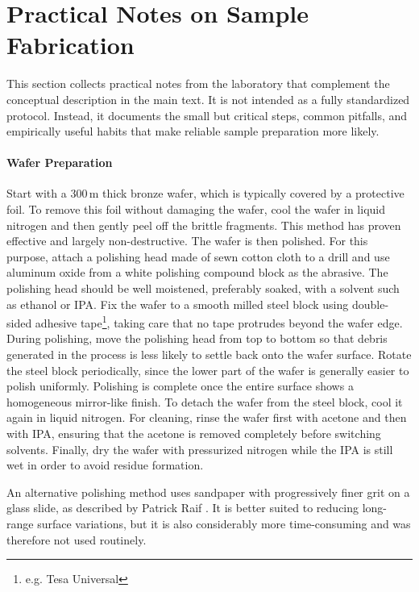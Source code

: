 \chapter{Practical Notes on Sample Fabrication}
\label{appendix:sample-fabrication}

    This section collects practical notes from the laboratory that complement the conceptual description in the main text. It is not intended as a fully standardized protocol. Instead, it documents the small but critical steps, common pitfalls, and empirically useful habits that make reliable sample preparation more likely.


    \subsubsection*{Wafer Preparation}
        Start with a 300\,\textmu m thick bronze wafer, which is typically covered by a protective foil. To remove this foil without damaging the wafer, cool the wafer in liquid nitrogen and then gently peel off the brittle fragments. This method has proven effective and largely non-destructive. The wafer is then polished. For this purpose, attach a polishing head made of sewn cotton cloth to a drill and use aluminum oxide from a white polishing compound block as the abrasive. The polishing head should be well moistened, preferably soaked, with a solvent such as ethanol or IPA. Fix the wafer to a smooth milled steel block using double-sided adhesive tape\footnote{e.g. Tesa Universal}, taking care that no tape protrudes beyond the wafer edge. During polishing, move the polishing head from top to bottom so that debris generated in the process is less likely to settle back onto the wafer surface. Rotate the steel block periodically, since the lower part of the wafer is generally easier to polish uniformly. Polishing is complete once the entire surface shows a homogeneous mirror-like finish. To detach the wafer from the steel block, cool it again in liquid nitrogen. For cleaning, rinse the wafer first with acetone and then with IPA, ensuring that the acetone is removed completely before switching solvents. Finally, dry the wafer with pressurized nitrogen while the IPA is still wet in order to avoid residue formation. \cite{oberg_machinerys_2000}
        
        An alternative polishing method uses sandpaper with progressively finer grit on a glass slide, as described by Patrick Raif \cite{raif_fabrication_2023}. It is better suited to reducing long-range surface variations, but it is also considerably more time-consuming and was therefore not used routinely.

